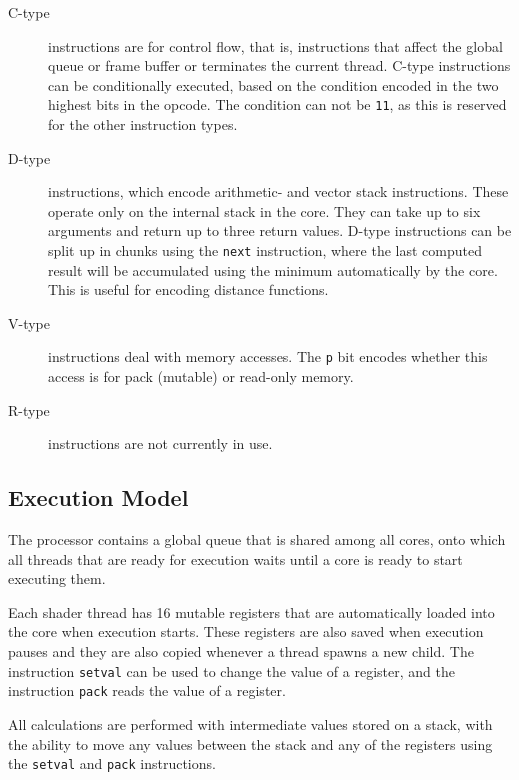 			\begin{description}
				\item[C-type] instructions are for control flow, that is, 
					instructions that affect the global queue or frame buffer or
					terminates the current thread. C-type instructions can be 
					conditionally executed, based on the condition encoded in
					the two highest bits in the opcode. The condition can not
					be \texttt{11}, as this is reserved for the other 
					instruction types.

				\item[D-type] instructions, which encode arithmetic- and vector
					stack instructions. These operate only on the internal stack
					in the core. They can take up to six arguments and return up
					to three return values. D-type instructions can be split up 
					in chunks using the \texttt{next} instruction, where the 
					last computed result will be accumulated using the minimum
					automatically by the core. This is useful for encoding 
					distance functions.
					
				\item[V-type] instructions deal with memory accesses. The
					\texttt{p} bit encodes whether this access is for pack
					(mutable) or read-only memory.

				\item[R-type] instructions are not currently in use.
			\end{description}
		
		\subsection{Execution Model}

			The processor contains a global queue that is shared among all
			cores, onto which all threads that are ready for execution waits
			until a core is ready to start executing them.
			
			Each shader thread has 16 mutable registers that are automatically
			loaded into the core when execution starts. These registers are
			also saved when execution pauses and they are also copied whenever
			a thread spawns a new child. The instruction \texttt{setval} can be
			used to change the value of a register, and the instruction
			\texttt{pack} reads the value of a register.
	
			All calculations are performed with intermediate values stored on a
			stack, with the ability to move any values between the stack and
			any of the registers using the \texttt{setval} and \texttt{pack}
			instructions.
	
